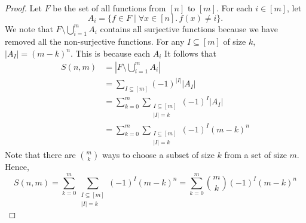 \begin{proof}
    Let $F$ be the set of all functions from $[n]$ to $[m]$. For each $i \in [m]$, let
    $$
    A_i = \{f \in F \mid \forall x \in [n].\, f(x) \neq i \}.
    $$
    We note that $F \setminus \bigcup_{i = 1}^m A_i$ contains all surjective functions because we have removed all the non-surjective functions. For any $I \subseteq [m]$ of size $k$, $|A_I| = (m-k)^n$. This is because each $A_i$  It follows that
    $$
    \begin{aligned}
        S(n,m) &= \left| F \setminus \bigcup_{i=1}^m A_i \right| \\
        &= \sum_{I \subseteq [m]} (-1)^{|I|} |A_I| \\
        &= \sum_{k=0}^m \sum_{\substack{I \subseteq [m] \\ |I| = k}} (-1)^{I} |A_I| \\
        &= \sum_{k=0}^m \sum_{\substack{I \subseteq [m] \\ |I| = k}} (-1)^{I} (m-k)^n
    \end{aligned}
    $$
    Note that there are $\binom{m}{k}$ ways to choose a subset of size $k$ from a set of size $m$. Hence,
    $$
    S(n,m) = \sum_{k=0}^m \sum_{\substack{I \subseteq [m] \\ |I| = k}} (-1)^{I} (m-k)^n = \sum_{k=0}^m \binom{m}{k} (-1)^{I} (m-k)^n
    $$
\end{proof}